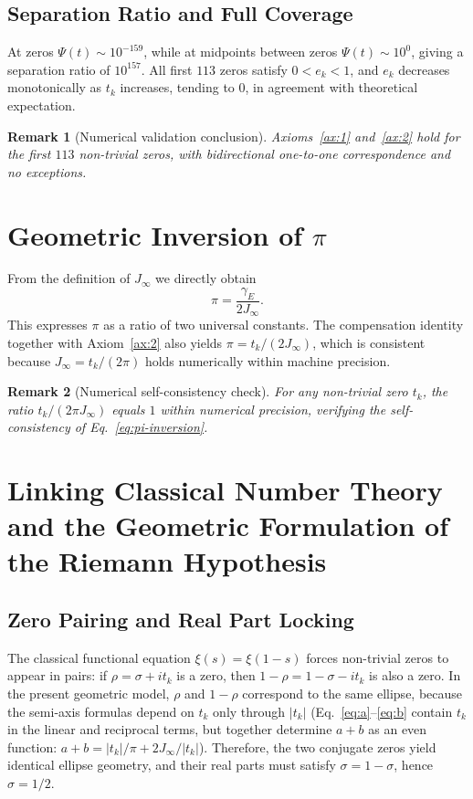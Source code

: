 \documentclass[12pt,a4paper]{article}
\newtheorem{remark}{Remark}[section]
\begin{document}
\subsection{Separation Ratio and Full Coverage}\label{subsec:separation}
At zeros $\Psi(t)\sim10^{-159}$, while at midpoints between zeros $\Psi(t)\sim10^{0}$, giving a separation ratio of $10^{157}$. All first $113$ zeros satisfy $0<e_k<1$, and $e_k$ decreases monotonically as $t_k$ increases, tending to $0$, in agreement with theoretical expectation.

\begin{remark}[Numerical validation conclusion]\label{rem:validation}
Axioms~\ref{ax:1} and~\ref{ax:2} hold for the first $113$ non-trivial zeros, with bidirectional one-to-one correspondence and no exceptions.
\end{remark}

\section{Geometric Inversion of $\pi$}\label{sec:pi}
From the definition of $J_\infty$ we directly obtain
\begin{equation}\label{eq:pi-inversion}
\pi = \frac{\gamma_E}{2J_\infty}.
\end{equation}
This expresses $\pi$ as a ratio of two universal constants. The compensation identity together with Axiom~\ref{ax:2} also yields $\pi = t_k/(2J_\infty)$, which is consistent because $J_\infty = t_k/(2\pi)$ holds numerically within machine precision.

\begin{remark}[Numerical self-consistency check]\label{rem:pi-check}
For any non-trivial zero $t_k$, the ratio $t_k/(2\pi J_\infty)$ equals $1$ within numerical precision, verifying the self-consistency of Eq.~\eqref{eq:pi-inversion}.
\end{remark}

\section{Linking Classical Number Theory and the Geometric Formulation of the Riemann Hypothesis}\label{sec:rh}
\subsection{Zero Pairing and Real Part Locking}\label{subsec:pairing}
The classical functional equation $\xi(s)=\xi(1-s)$ forces non-trivial zeros to appear in pairs: if $\rho=\sigma+it_k$ is a zero, then $1-\rho=1-\sigma-it_k$ is also a zero. In the present geometric model, $\rho$ and $1-\rho$ correspond to the same ellipse, because the semi-axis formulas depend on $t_k$ only through $|t_k|$ (Eq.~\eqref{eq:a}--\eqref{eq:b} contain $t_k$ in the linear and reciprocal terms, but together determine $a+b$ as an even function: $a+b = |t_k|/\pi + 2J_\infty/|t_k|$). Therefore, the two conjugate zeros yield identical ellipse geometry, and their real parts must satisfy $\sigma = 1-\sigma$, hence $\sigma = 1/2$.
\end{document}
